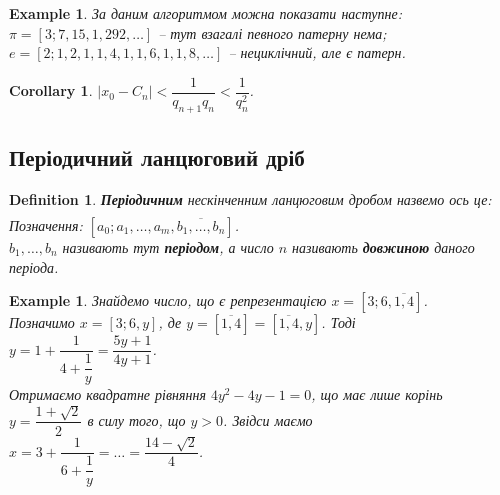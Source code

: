 \documentclass[a4paper, 10pt]{article}
\theoremstyle{theoremdd}
\theoremstyle{theoremdd}
\newtheorem{definition}[theorem]{Definition}
\theoremstyle{theoremdd}
\theoremstyle{theoremdd}
\newtheorem{example}[theorem]{Example}
\theoremstyle{theoremdd}
\theoremstyle{theoremdd}
\theoremstyle{theoremdd}
\theoremstyle{theoremdd}
\newtheorem{corollary}[theorem]{Corollary}
\begin{document}
\begin{example}
За даним алгоритмом можна показати наступне:\\
$\pi = [3;7,15,1,292,\dots]$ -- тут взагалі певного патерну нема;\\
$e = [2;1,2,1,1,4,1,1,6,1,1,8,\dots]$ -- нециклічний, але є патерн.
\end{example}

\begin{corollary}
\label{if convergent, then estimation}
$\left| x_0 - C_n \right| < \dfrac{1}{q_{n+1}q_n} < \dfrac{1}{q_{n}^2}$.
\end{corollary}

\subsection{Періодичний ланцюговий дріб}
\begin{definition}
\textbf{Періодичним} нескінченним ланцюговим дробом назвемо ось це:
\begin{align*}
[a_0; a_1,\dots,a_m,b_1,\dots,b_n,b_1,\dots,b_n,b_1,\dots,b_n,\dots]
\end{align*}
Позначення: $[a_0;a_1,\dots,a_m, \overline{b_1,\dots,b_n}]$.\\
$b_1,\dots,b_n$ називають тут \textbf{періодом}, а число $n$ називають \textbf{довжиною} даного періода.
\end{definition}

\begin{example}
Знайдемо число, що є репрезентацією $x = [3;6,\overline{1,4}]$.\\
Позначимо $x = [3;6,y]$, де $y = [\overline{1,4}] = [\overline{1,4},y]$. Тоді \\
$y = 1 + \dfrac{1}{4+\dfrac{1}{y}} = \dfrac{5y+1}{4y+1}$.\\
Отримаємо квадратне рівняння $4y^2-4y-1=0$, що має лише корінь $y = \dfrac{1+\sqrt{2}}{2}$ в силу того, що $y > 0$. Звідси маємо\\
$x = 3 + \dfrac{1}{6 + \dfrac{1}{y}} = \dots = \dfrac{14-\sqrt{2}}{4}$.
\end{example}
\end{document}
